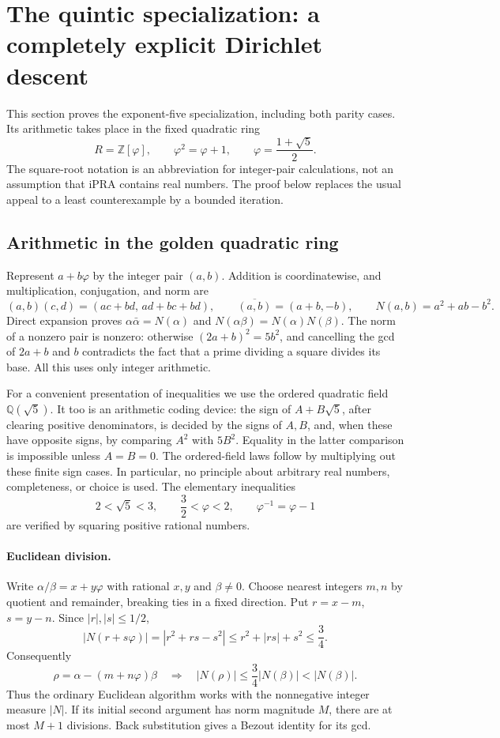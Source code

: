 \section{The quintic specialization: a completely explicit Dirichlet descent}
\label{sec:five}

This section proves the exponent-five specialization, including both parity
cases.  Its arithmetic takes place in the fixed quadratic ring
\[
 R=\mathbb Z[\varphi],\qquad
 \varphi^2=\varphi+1,\qquad
 \varphi=\frac{1+\sqrt5}{2}.
\]
The square-root notation is an abbreviation for integer-pair calculations,
not an assumption that iPRA contains real numbers.  The proof below replaces
the usual appeal to a least counterexample by a bounded iteration.

\subsection{Arithmetic in the golden quadratic ring}

Represent \(a+b\varphi\) by the integer pair \((a,b)\).  Addition is
coordinatewise, and multiplication, conjugation, and norm are
\[
 (a,b)(c,d)=(ac+bd,\,ad+bc+bd),\qquad
 \overline{(a,b)}=(a+b,-b),\qquad
 N(a,b)=a^2+ab-b^2.
\]
Direct expansion proves
\(\alpha\bar\alpha=N(\alpha)\) and
\(N(\alpha\beta)=N(\alpha)N(\beta)\).
The norm of a nonzero pair is nonzero: otherwise
\((2a+b)^2=5b^2\), and cancelling the gcd of \(2a+b\) and \(b\)
contradicts the fact that a prime dividing a square divides its base.
All this uses only integer arithmetic.

For a convenient presentation of inequalities we use the ordered quadratic
field \(\mathbb Q(\sqrt5)\).  It too is an arithmetic coding device:
the sign of \(A+B\sqrt5\), after clearing positive denominators, is decided
by the signs of \(A,B\), and, when these have opposite signs, by comparing
\(A^2\) with \(5B^2\).  Equality in the latter comparison is impossible
unless \(A=B=0\).  The ordered-field laws follow by multiplying out these
finite sign cases.  In particular, no principle about arbitrary real
numbers, completeness, or choice is used.  The elementary inequalities
\[
 2<\sqrt5<3,\qquad \frac32<\varphi<2,\qquad
 \varphi^{-1}=\varphi-1
\]
are verified by squaring positive rational numbers.

\paragraph{Euclidean division.}
Write \(\alpha/\beta=x+y\varphi\) with rational \(x,y\) and
\(\beta\ne0\).  Choose nearest integers \(m,n\) by quotient and remainder,
breaking ties in a fixed direction.  Put
\(r=x-m\), \(s=y-n\).  Since \(|r|,|s|\le1/2\),
\[
 |N(r+s\varphi)|
 =|r^2+rs-s^2|\le r^2+|rs|+s^2\le\frac34.
\]
Consequently
\[
 \rho=\alpha-(m+n\varphi)\beta
 \quad\Longrightarrow\quad
 |N(\rho)|\le\frac34|N(\beta)|<|N(\beta)|.
\]
Thus the ordinary Euclidean algorithm works with the nonnegative integer
measure \(|N|\).  If its initial second argument has norm magnitude \(M\),
there are at most \(M+1\) divisions.  Back substitution gives a Bezout
identity for its gcd.

